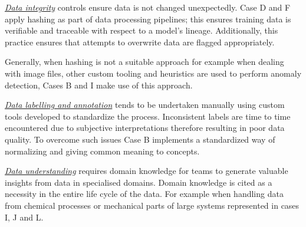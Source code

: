 \underline{\emph{Data integrity}}
controls ensure data is not changed unexpectedly. Case D and F apply hashing as part of data processing pipelines; this ensures training data is verifiable and traceable with respect to a model's lineage. Additionally, this practice ensures that attempts to overwrite data are flagged appropriately.

Generally, when hashing is not a suitable approach for example when dealing with image files, other custom tooling and heuristics are used to perform anomaly detection, Cases B and I make use of this approach. %

% 


\underline{\emph{Data labelling and annotation}} tends to be undertaken manually using custom tools developed to standardize the process. %
Inconsistent labels are time to time encountered due to subjective interpretations therefore resulting in poor data quality. To overcome such issues Case B implements a standardized way of normalizing and giving common meaning to concepts. %

\underline{\emph{Data understanding}} requires domain knowledge for teams to generate valuable insights from data in specialised domains. Domain knowledge is cited as a necessity in the entire life cycle of the data. For example when handling data from chemical processes or mechanical parts of large systems represented in cases I, J and L. %

